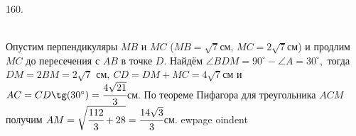 160. \begin{figure}[ht!]
\end{figure}\\
Опустим перпендикуляры $MB$ и $MC$ ($MB=\sqrt{7}$см, $MC=2\sqrt{7}$см) и продлим $MC$ до пересечения с $AB$ в точке $D.$ Найдём $\angle BDM=90^\circ-\angle A=30^\circ,$ тогда $DM=2BM=2\sqrt{7}\text{ см},\ CD=DM+MC=4\sqrt{7}$см и $AC=CD\tg(30^\circ)=\cfrac{4\sqrt{21}}{3}$см. По теореме Пифагора для треугольника $ACM$ получим $AM=\sqrt{\cfrac{112}{3}+28}=\cfrac{14\sqrt{3}}{3}$см.
ewpage
oindent
